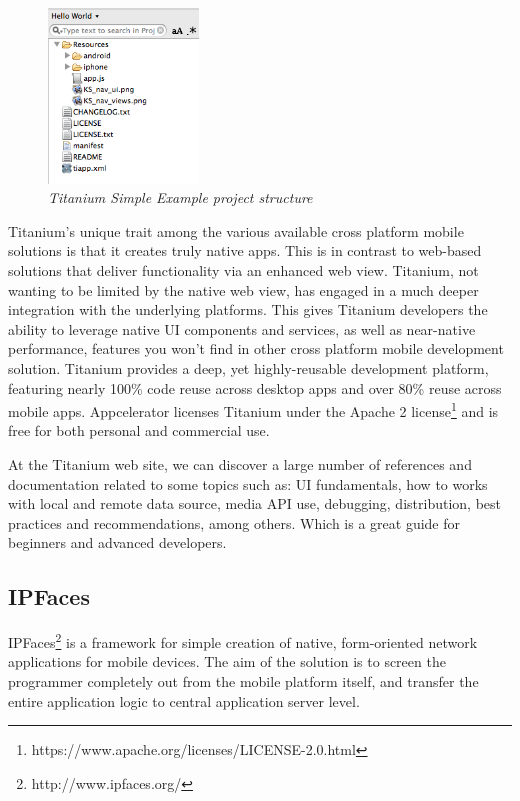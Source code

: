 \documentclass[a4paper,12pt]{book}
\begin{document}
\begin{figure}[H]
    \centering
    \includegraphics[width=4cm, keepaspectratio]{img/titanium.png}
    \caption{\textit{Titanium Simple Example project structure}}
 \end{figure}

Titanium's unique trait among the various available cross platform mobile solutions is that it creates truly native apps. This is in contrast to web-based solutions that deliver functionality via an enhanced web view. Titanium, not wanting to be limited by the native web view, has engaged in a much deeper integration with the underlying platforms. This gives Titanium developers the ability to leverage native UI components and services, as well as near-native performance, features you won't find in other cross platform mobile development solution. Titanium provides a deep, yet highly-reusable development platform, featuring nearly 100\% code reuse across desktop apps and over 80\% reuse across mobile apps. Appcelerator licenses Titanium under the Apache 2 license\footnote{https://www.apache.org/licenses/LICENSE-2.0.html}  and is free for both personal and commercial use.

At the Titanium web site, we can discover a large number of references and documentation related to some topics such as: UI fundamentals, how to works with local and remote data source, media API use, debugging, distribution, best practices and recommendations, among others. Which is a great guide for beginners and advanced developers.

\subsection{IPFaces}
\label{IPFaces} 

IPFaces\footnote{http://www.ipfaces.org/} is a framework for simple creation of native, form-oriented network applications for mobile devices. The aim of the solution is to screen the programmer completely out from the mobile platform itself, and transfer the entire application logic to central application server level.
\end{document}
